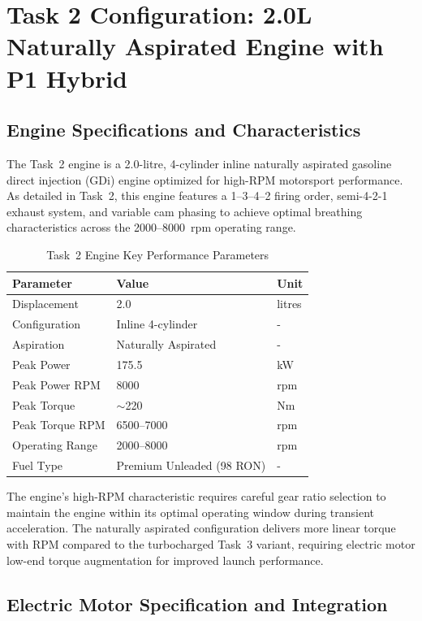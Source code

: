\section{Task 2 Configuration: 2.0L Naturally Aspirated Engine with P1 Hybrid}

\subsection{Engine Specifications and Characteristics}

The Task~2 engine is a 2.0-litre, 4-cylinder inline naturally aspirated gasoline direct injection (GDi) engine optimized for high-RPM motorsport performance. As detailed in Task~2, this engine features a 1--3--4--2 firing order, semi-4-2-1 exhaust system, and variable cam phasing to achieve optimal breathing characteristics across the 2000--8000~rpm operating range.

\begin{table}[H]
\centering
\caption{Task~2 Engine Key Performance Parameters}
\label{tab:task2_engine_summary}
\small
\begin{tabular}{@{}lll@{}}
\toprule
\textbf{Parameter} & \textbf{Value} & \textbf{Unit} \\
\midrule
Displacement & 2.0 & litres \\
Configuration & Inline 4-cylinder & - \\
Aspiration & Naturally Aspirated & - \\
Peak Power & 175.5 & kW \\
Peak Power RPM & 8000 & rpm \\
Peak Torque & $\sim$220 & Nm \\
Peak Torque RPM & 6500--7000 & rpm \\
Operating Range & 2000--8000 & rpm \\
Fuel Type & Premium Unleaded (98 RON) & - \\
\bottomrule
\end{tabular}
\end{table}

The engine's high-RPM characteristic requires careful gear ratio selection to maintain the engine within its optimal operating window during transient acceleration. The naturally aspirated configuration delivers more linear torque with RPM compared to the turbocharged Task~3 variant, requiring electric motor low-end torque augmentation for improved launch performance.

\subsection{Electric Motor Specification and Integration}

